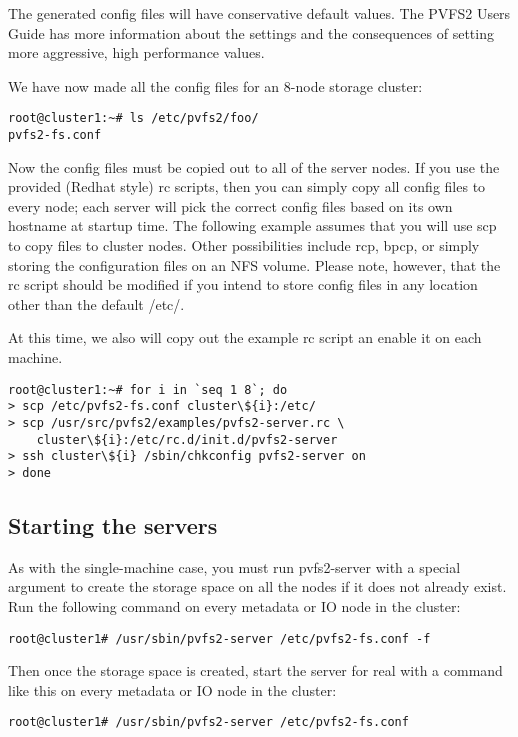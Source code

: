 \documentclass[11pt, letterpaper]{article}
\begin{document}
The generated config files will have conservative default values.  The PVFS2
Users Guide has more information about the settings and the consequences of
setting more aggressive, high performance values.

We have now made all the config files for an 8-node storage cluster:
\begin{verbatim}
root@cluster1:~# ls /etc/pvfs2/foo/
pvfs2-fs.conf
\end{verbatim}

Now the config files must be copied out to all of the server nodes.  If you 
use the provided (Redhat style) rc scripts, then you can simply copy all
config files to every node; each server will pick the correct config files
based on its own hostname at startup time.  The following example assumes
that you will use scp to copy files to cluster nodes.  Other possibilities
include rcp, bpcp, or simply storing the configuration files on an NFS volume.
Please note, however, that the rc script should be modified if you intend
to store config files in any location other than the default /etc/.

At this time, we also will copy out the example rc script an enable it on
each machine.

\begin{verbatim}
root@cluster1:~# for i in `seq 1 8`; do
> scp /etc/pvfs2-fs.conf cluster\${i}:/etc/
> scp /usr/src/pvfs2/examples/pvfs2-server.rc \
    cluster\${i}:/etc/rc.d/init.d/pvfs2-server
> ssh cluster\${i} /sbin/chkconfig pvfs2-server on
> done
\end{verbatim}

\subsection{Starting the servers}

As with the single-machine case, you must run pvfs2-server with a
special argument to create the storage space on all the nodes if it
does not already exist.  Run the following command on every metadata
or IO node in the cluster:

\begin{verbatim}
root@cluster1# /usr/sbin/pvfs2-server /etc/pvfs2-fs.conf -f
\end{verbatim}

Then once the storage space is created, start the server for real with a
command like this on every metadata or IO node in the cluster:

\begin{verbatim}
root@cluster1# /usr/sbin/pvfs2-server /etc/pvfs2-fs.conf
\end{verbatim}
\end{document}
